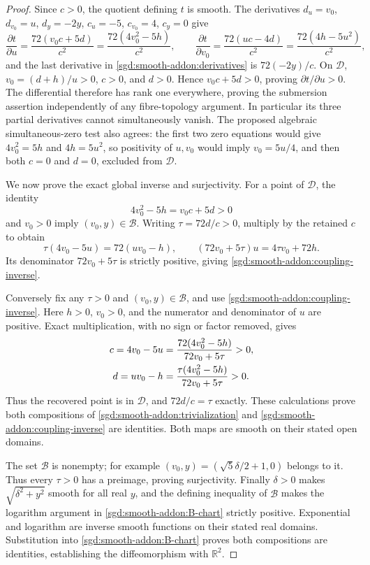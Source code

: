 \begin{proof}
Since $c>0$, the quotient defining $t$ is smooth.
The derivatives $d_u=v_0$, $d_{v_0}=u$, $d_y=-2y$,
$c_u=-5$, $c_{v_0}=4$, $c_y=0$ give
\[
 \frac{\partial t}{\partial u}
 =\frac{72(v_0c+5d)}{c^2}
 =\frac{72(4v_0^2-5h)}{c^2},
 \qquad
 \frac{\partial t}{\partial v_0}
 =\frac{72(uc-4d)}{c^2}
 =\frac{72(4h-5u^2)}{c^2},
\]
and the last derivative in \eqref{sgd:smooth-addon:derivatives}
is $72(-2y)/c$.
On $\mathcal D$, $v_0=(d+h)/u>0$, $c>0$, and $d>0$.
Hence $v_0c+5d>0$, proving $\partial t/\partial u>0$.
The differential therefore has rank one everywhere, proving the
submersion assertion independently of any fibre-topology argument.
In particular its three partial derivatives cannot simultaneously
vanish. The proposed algebraic simultaneous-zero test also agrees:
the first two zero equations would give
$4v_0^2=5h$ and $4h=5u^2$, so positivity of $u,v_0$ would imply
$v_0=5u/4$, and then both $c=0$ and $d=0$, excluded from $\mathcal D$.

We now prove the exact global inverse and surjectivity.
For a point of $\mathcal D$, the identity
\[
 4v_0^2-5h=v_0c+5d>0
\]
and $v_0>0$ imply $(v_0,y)\in\mathcal B$.
Writing $\tau=72d/c>0$, multiply by the retained $c$ to obtain
\[
 \tau(4v_0-5u)=72(uv_0-h),
 \qquad
 (72v_0+5\tau)u=4\tau v_0+72h.
\]
Its denominator $72v_0+5\tau$ is strictly positive, giving
\eqref{sgd:smooth-addon:coupling-inverse}.

Conversely fix any $\tau>0$ and $(v_0,y)\in\mathcal B$, and use
\eqref{sgd:smooth-addon:coupling-inverse}. Here $h>0$, $v_0>0$,
and the numerator and denominator of $u$ are positive.
Exact multiplication, with no sign or factor removed, gives
\begin{align}
 c=4v_0-5u
 &=\frac{72(4v_0^2-5h)}{72v_0+5\tau}>0,\notag\\
 d=uv_0-h
 &=\frac{\tau(4v_0^2-5h)}{72v_0+5\tau}>0.
 \label{sgd:smooth-addon:inverse-domain}
\end{align}
Thus the recovered point is in $\mathcal D$, and
$72d/c=\tau$ exactly.
These calculations prove both compositions of
\eqref{sgd:smooth-addon:trivialization} and
\eqref{sgd:smooth-addon:coupling-inverse} are identities.
Both maps are smooth on their stated open domains.

The set $\mathcal B$ is nonempty; for example
$(v_0,y)=(\sqrt5\delta/2+1,0)$ belongs to it.
Thus every $\tau>0$ has a preimage, proving surjectivity.
Finally $\delta>0$ makes $\sqrt{\delta^2+y^2}$ smooth for all real
$y$, and the defining inequality of $\mathcal B$ makes the
logarithm argument in \eqref{sgd:smooth-addon:B-chart} strictly
positive. Exponential and logarithm are inverse smooth functions
on their stated real domains. Substitution into
\eqref{sgd:smooth-addon:B-chart} proves both compositions are
identities, establishing the diffeomorphism with $\mathbb R^2$.
\end{proof}

